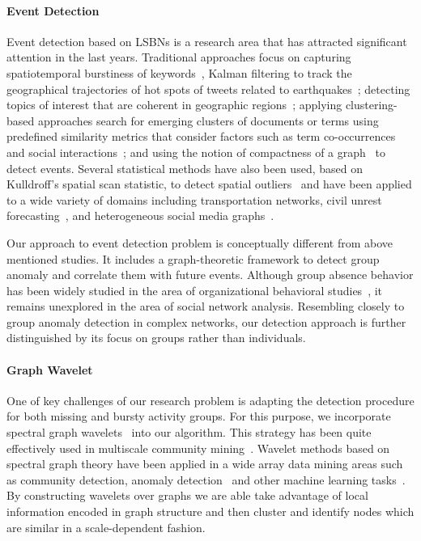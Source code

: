 \documentclass[conference]{IEEEtran}
\begin{document}
\paragraph{Event Detection}
Event detection based on LSBNs is a research area that has attracted significant attention in the last years. Traditional approaches focus on capturing spatiotemporal burstiness of keywords~\cite{lappas2009burstiness,lappas2012spatiotemporal}, Kalman filtering to track the geographical trajectories of hot spots of tweets related to earthquakes~\cite{sakaki2010earthquake}; detecting topics of interest that are coherent in geographic regions~\cite{eisenstein2010latent,hong2012discovering,yin2011geographical}; applying clustering-based approaches search for emerging clusters of documents or terms using predefined similarity metrics that consider factors such as term co-occurrences and social interactions~\cite{aggarwal2012event,sayyadi2009event,watanabe2011jasmine,weng2011event}; and using the notion of compactness of a graph~\cite{rozenshtein2014event} to detect events. Several statistical methods have also been used, based on Kulldroff's spatial scan statistic\cite{kulldorff1997spatial}, to detect spatial outliers~\cite{chen2008detecting} and have been applied to a wide variety of domains including transportation networks, civil unrest forecasting~\cite{zhao2014unsupervised}, and heterogeneous social media graphs~\cite{chen2014non}.

Our approach to event detection problem is conceptually different from above mentioned studies. It includes a graph-theoretic framework to detect group anomaly and correlate them with future events. Although group absence behavior has been widely studied in the area of organizational behavioral studies~\cite{gaudine2001effects,seamonds1982stress}, it remains unexplored in the area of social network analysis. Resembling closely to group anomaly detection in complex networks, our detection approach is further distinguished by its focus on groups rather than individuals.

\paragraph{Graph Wavelet}
One of key challenges of our research problem is adapting the detection procedure for both missing and bursty activity groups. For this purpose, we incorporate spectral graph wavelets~\cite{hammond2011wavelets} into our algorithm. This strategy has been quite effectively used in multiscale community mining~\cite{tremblay2014graph}.
Wavelet methods based on spectral graph theory have been applied in a wide array data mining areas such as community detection, anomaly detection~\cite{calderara2011detecting} and other machine learning tasks~\cite{shuman_ACHA_2013,ghosh2003wavelet,rustamov2013wavelets,2000wavecluster}. By constructing wavelets over graphs we are able take advantage of local information encoded in graph structure and then cluster and identify nodes which are similar in a scale-dependent fashion.
\end{document}
